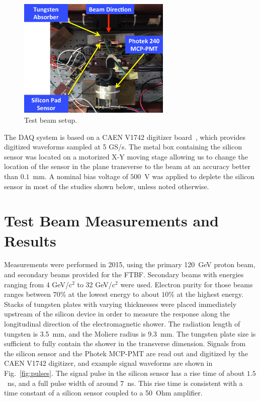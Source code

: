 \begin{figure}[htbp] 
\centering
\includegraphics[width=0.65\textwidth]{plots/BeamPhotoDiagram.pdf} 
\caption{Test beam setup.} 
\label{fig:BeamPhotoDiagram} 
\end{figure} 

The DAQ system is based on a CAEN V1742 digitizer board~\cite{CAENDRS}, which
provides digitized waveforms sampled at 5 GS/s. The metal box containing the
silicon sensor was located on a motorized X-Y moving stage allowing us to change
the location of the sensor in the plane transverse to the beam at an accuracy
better than $0.1$~mm. A nominal bias voltage of $500$~V was applied to deplete
the silicon sensor in most of the studies shown below, unless noted otherwise.


\section{Test Beam Measurements and Results} 
\label{sec:results} 

Measurements were performed in 2015, using the primary 120~GeV proton beam, and secondary
beams provided for the FTBF. Secondary beams with energies ranging from 4
GeV/c$^2$ to 32 GeV/c$^2$ were used. Electron purity for those beams ranges
between $70\%$ at the lowest energy to about $10\%$ at the highest energy.
Stacks of tungsten plates with varying thicknesses were placed immediately
upstream of the silicon device in order to measure the response along the
longitudinal direction of the electromagnetic shower. The radiation length of
tungsten is 3.5~mm, and the Moliere radius is 9.3~mm. The tungsten plate size is
sufficient to fully contain the shower in the transverse dimension. Signals from
the silicon sensor and the Photek MCP-PMT are read out and digitized by the CAEN
V1742 digitizer, and example signal waveforms are shown in
Fig.~\ref{fig:pulses}. The signal pulse in the silicon sensor has a rise time of
about $1.5$~ns, and a full pulse width of around $7$~ns. This rise time is
consistent with a time constant of a silicon sensor coupled to a 50~Ohm amplifier.


